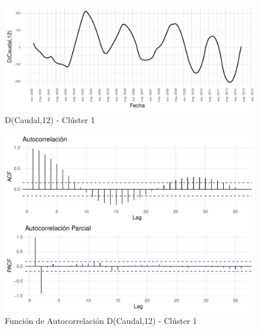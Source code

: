 \documentclass[12pt,oneside]{book}\usepackage[]{graphicx}\usepackage[]{color}
\makeatletter
\def\maxwidth{ %
  \ifdim\Gin@nat@width>\linewidth
    \linewidth
  \else
    \Gin@nat@width
  \fi
}
\newenvironment{knitrout}{}{} %
\theoremstyle{definition} %
\makeatother
\begin{document}
\begin{knitrout}
\color{fgcolor}\begin{figure}[H]

{\centering \includegraphics[width=\maxwidth]{figure/unnamed-chunk-10-1} 

}

\caption{\label{fig:sarima_seried1} D(Caudal,12) - Clúster 1}\label{fig:unnamed-chunk-10}
\end{figure}


\end{knitrout}



\begin{knitrout}
\color{fgcolor}\begin{figure}[H]

{\centering \includegraphics[width=\maxwidth]{figure/unnamed-chunk-11-1} 

}

\caption{\label{fig:sarima_acf2} Función de Autocorrelación D(Caudal,12) - Clúster 1}\label{fig:unnamed-chunk-11}
\end{figure}


\end{knitrout}
\end{document}
